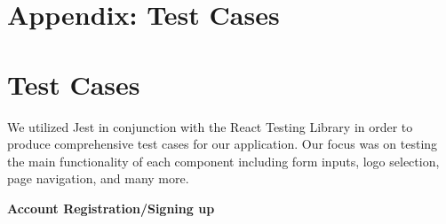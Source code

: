 \clearpage 
\pagebreak
\section*{Appendix: Test Cases}

\section{Test Cases}
We utilized Jest in conjunction with the React Testing Library in order to produce comprehensive test cases for our application. Our focus was on testing the main functionality of each component including form inputs, logo selection, page navigation, and many more.

\noindent

\textbf{Account Registration/Signing up}

